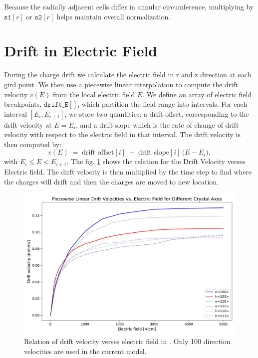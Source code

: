 Because the radially adjacent cells differ in annular circumference, 
multiplying by \(\texttt{s1}[r]\) or \(\texttt{s2}[r]\) 
helps maintain overall normalization.

\section{Drift in Electric Field}

During the charge drift we calculate the electric field in r and z direction at each gird point. We then use a piecewise linear interpolation to compute the drift velocity $v(E)$ from the local electric field $E$. We define an array of electric field breakpoints, $\texttt{drift\_E}[]$, which partition the field
range into intervals. For each interval $[E_i, E_{i+1}]$, we store two quantities: a drift offset, corresponding to the drift velocity at $E = E_i$, and a drift slope which is the rate of change of drift velocity with respect to the electric field in that interval. The drift velocity is then
computed by:
\[
v(E) \;=\; \text{drift offset}[i]
\;+\; \text{drift slope}[i] \,\bigl( E - E_i \bigr),
\]
with $E_i \le E < E_{i+1}$. The fig. \ref{ch3:fig:dv_vs_e} shows the relation for the Drift Velocity verses Electric field. The dirft velocity is then multiplied by the time step to find where the charges will drift and then the charges are moved to new location.

\begin{figure}
    \includegraphics[trim={0cm 0 0cm 0},clip,width=0.99\linewidth]{ch3/figs/ehd_dv_e.pdf}
    \caption{Relation of drift velocity verses electric field in {\tdsim}. Only 100 direction velocities are used in the current model.}
    \label{ch3:fig:dv_vs_e}
\end{figure}

